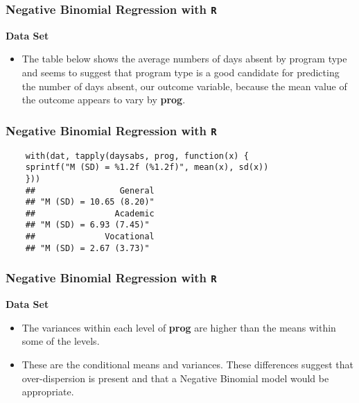 \documentclass[MASTER.tex]{subfiles}
\begin{document}
\begin{frame}[fragile]
	\frametitle{Negative Binomial Regression with \texttt{R} }
	\Large
\textbf{Data Set}
\begin{itemize}
\item The table below shows the average numbers of days absent by program type and seems to 
	suggest that program type is a good candidate for predicting the number of days absent, our outcome variable, 
	because the mean value of the outcome appears to vary by \textbf{prog}. 
	\end{itemize}
\end{frame}
\begin{frame}[fragile]
	\frametitle{Negative Binomial Regression with \texttt{R} }
	\large
	\begin{verbatim}
	with(dat, tapply(daysabs, prog, function(x) {
	sprintf("M (SD) = %1.2f (%1.2f)", mean(x), sd(x))
	}))
	##                 General                           
	## "M (SD) = 10.65 (8.20)"  
	##                Academic  
	## "M (SD) = 6.93 (7.45)" 
	##              Vocational 
	## "M (SD) = 2.67 (3.73)"
	\end{verbatim}
\end{frame}
\begin{frame}[fragile]
	\frametitle{Negative Binomial Regression with \texttt{R} }
	\Large
\textbf{Data Set}
\begin{itemize}	
\item The variances within each level of \textbf{prog} are higher than the means within some of the levels. 
\item These are the conditional means and variances. These differences suggest that over-dispersion is present and 
that a Negative Binomial model would be appropriate.
\end{itemize}
\end{frame}
\end{document}
